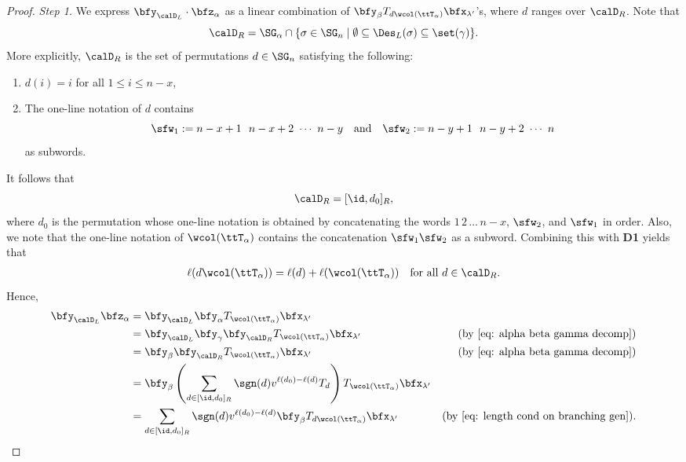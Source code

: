\documentclass[12pt, reqno]{amsart}
\theoremstyle{plain}
\theoremstyle{definition}
\numberwithin{equation}{section}
\numberwithin{figure}{section}
\numberwithin{table}{section}
\begin{document}
\begin{proof}
{\it Step 1.} We express $\bfy_{\calD_L} \cdot \bfz_\alpha$ as a linear combination of $\bfy_\beta T_{d \wcol(\ttT_\alpha)} \bfx_{\lambda'}$'s, where $d$ ranges over $\calD_R$.
Note that 
\[
\calD_R
=
\SG_{\alpha} \cap
\{\sigma \in \SG_n \mid \emptyset \subseteq \Des_L(\sigma) \subseteq \set(\gamma)\}.
\]
More explicitly, $\calD_R$ is the set of permutations $d \in \SG_n$ satisfying the following:
\begin{enumerate}[label = {\bf D\arabic*.}]
\item $d(i) = i$ for all $1 \leq i \leq n-x$,
\item The one-line notation of $d$ contains 
\[
\sfw_1 := n-x+1 \ \ n-x+2 \ \cdots \ n- y\quad\text{and}\quad \sfw_2 := n-y+1 \ \ n-y+2 \ \cdots\ n
\]
as subwords.
\end{enumerate}
It follows that  
$$\calD_R =   [\id,d_0]_R,$$ 
where $d_0$ is the permutation whose one-line notation is obtained by concatenating the words $1\, 2\, \ldots\, n-x$, $\sfw_2$, and $\sfw_1$ in order.
Also, we note that the one-line notation of $\wcol(\ttT_\alpha)$ contains the concatenation $\sfw_1 \sfw_2$ as a subword.
Combining this with \textbf{D1} yields that 
\begin{align}\label{eq: length cond on branching gen}
\ell(d \wcol(\ttT_\alpha)) = \ell(d) + \ell(\wcol(\ttT_\alpha)) \quad \text{for all $d \in \calD_R$.}
\end{align}
Hence,  
\begin{align*}
\bfy_{\calD_L} \bfz_\alpha 
&= \bfy_{\calD_L} \bfy_\alpha T_{\wcol(\ttT_\alpha)} \bfx_{\lambda'} \\
&= \bfy_{\calD_L} \bfy_\gamma  \bfy_{\calD_R} T_{\wcol(\ttT_\alpha)}  \bfx_{\lambda'} &(\text{by \cref{eq: alpha beta gamma decomp}})\\
&= \bfy_{\beta} \bfy_{\calD_R} T_{\wcol(\ttT_\alpha)}  \bfx_{\lambda'} &(\text{by \cref{eq: alpha beta gamma decomp}})\\
&= 
\bfy_{\beta} 
\left(
\sum_{d \in [\id, d_0]_R} \sgn(d) v^{\ell(d_0) - \ell(d)}T_{d}
\right)
T_{\wcol(\ttT_\alpha)} \bfx_{\lambda'}
\\
&=  \sum_{d \in [\id, d_0]_R} \sgn(d) v^{\ell(d_0) - \ell(d)} \bfy_\beta T_{d \wcol(\ttT_\alpha)} \bfx_{\lambda'} &(\text{by \cref{eq: length cond on branching gen}}).
\end{align*}



\end{proof}
\end{document}
